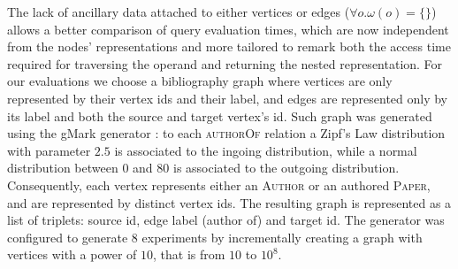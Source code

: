 The lack of ancillary data attached to either vertices or edges ($\forall o. \omega(o)=\{\}$) allows a better comparison of query evaluation times, which are now independent from the nodes' representations and more tailored to remark both the access time required for traversing the operand and returning the nested representation.
For our evaluations we choose a bibliography graph where vertices are only represented by their vertex ids and their label, and edges are represented only by its label and both the source and target vertex's id. Such graph was generated using the gMark generator \cite{BBCFLA17}: to each \textsc{authorOf} relation a Zipf's Law distribution with parameter $2.5$ is associated to the ingoing distribution, while a normal distribution between $0$ and $80$ is associated to the outgoing distribution. Consequently, each vertex represents either an \textsc{Author} or an authored \textsc{Paper}, and are represented by distinct vertex ids. The resulting graph is represented as a list of triplets: source id, edge label (author of) and target id. The generator was configured to generate $8$ experiments by incrementally creating a graph with vertices with a power of $10$, that is from $10$ to $10^8$. 


